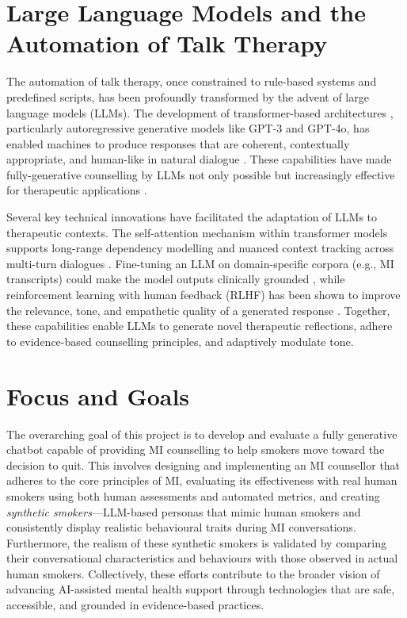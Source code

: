 \section{Large Language Models and the Automation of Talk Therapy}
The automation of talk therapy, once constrained to rule-based systems and predefined scripts, has been profoundly transformed by the advent of large language models (LLMs). The development of transformer-based architectures \cite{vaswani2017attention}, particularly autoregressive generative models like GPT-3 and GPT-4o, has enabled machines to produce responses that are coherent, contextually appropriate, and human-like in natural dialogue \cite{openai2023gpt4}. These capabilities have made fully-generative counselling by LLMs not only possible but increasingly effective for therapeutic applications \cite{miner2020artificial, LEE2021856}.

Several key technical innovations have facilitated the adaptation of LLMs to therapeutic contexts. The self-attention mechanism within transformer models supports long-range dependency modelling and nuanced context tracking across multi-turn dialogues \cite{vaswani2017attention}. Fine-tuning an LLM on domain-specific corpora (e.g., MI transcripts) could make the model outputs clinically grounded \cite{kong2025llmtherapistssalespeopleevaluating}, while reinforcement learning with human feedback (RLHF) has been shown to improve the relevance, tone, and empathetic quality of a generated response \cite{10.5555/3600270.3602281}. Together, these capabilities enable LLMs to generate novel therapeutic reflections, adhere to evidence-based counselling principles, and adaptively modulate tone.



\section{Focus and Goals}
The overarching goal of this project is to develop and evaluate a fully generative chatbot capable of providing MI counselling to help smokers move toward the decision to quit. This involves designing and implementing an MI counsellor that adheres to the core principles of MI, evaluating its effectiveness with real human smokers using both human assessments and automated metrics, and creating \emph{synthetic smokers}---LLM-based personas that mimic human smokers and consistently display realistic behavioural traits during MI conversations. Furthermore, the realism of these synthetic smokers is validated by comparing their conversational characteristics and behaviours with those observed in actual human smokers. Collectively, these efforts contribute to the broader vision of advancing AI-assisted mental health support through technologies that are safe, accessible, and grounded in evidence-based practices.

